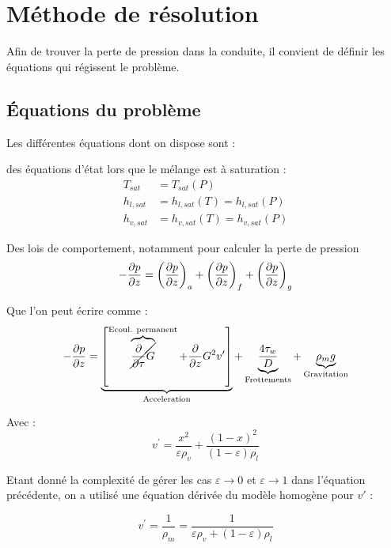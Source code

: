 \section{Méthode de résolution\label{section:res}}
Afin de trouver la perte de pression dans la conduite, il convient de définir les équations qui régissent le problème.
\subsection{Équations du problème}
Les différentes équations dont on dispose sont :

des équations d'état lors que le mélange est à saturation :
\begin{align}
    T_{sat} &= T_{sat}(P) \\
    h_{l,sat} &= h_{l,sat}(T) = h_{l,sat}(P) \\
    h_{v,sat} &= h_{v,sat}(T) = h_{v,sat}(P)
\end{align}

Des lois de comportement, notamment pour calculer la perte de pression
\begin{equation}
     -\pder[p]{z} = \left(\pder[p]{z} \right)_{a} + \left(\pder[p]{z} \right)_{f} + \left(\pder[p]{z} \right)_{g}
\end{equation}

Que l'on peut écrire comme :
\begin{equation}
    -\pder[p]{z} = \underbrace{\left[\overbrace{\cancel{\frac{\partial}{\partial \tau} G}}^{\text{Ecoul. permanent}}+\frac{\partial}{\partial z} G^{2} v^{\prime}\right]}_{\text{Acceleration}}+\underbrace{\frac{4 \tau_{w}}{D}}_{\text{Frottements}}+\underbrace{\rho_{m} g}_{\text{Gravitation}}
\end{equation}

Avec :
\begin{equation}
    v^{\prime}=\frac{x^{2}}{\varepsilon \rho_{v}}+\frac{(1-x)^{2}}{(1-\varepsilon) \rho_{l}}
\end{equation}

Etant donné la complexité de gérer les cas $\varepsilon \rightarrow 0$ et $\varepsilon \rightarrow 1$ dans l'équation précédente, on a utilisé une équation dérivée du modèle homogène pour $v'$ :

\begin{equation}
    v^{\prime} = \frac{1}{\rho_m} = \frac{1}{\varepsilon \rho_v + (1-\varepsilon)\rho_l }
\end{equation}

